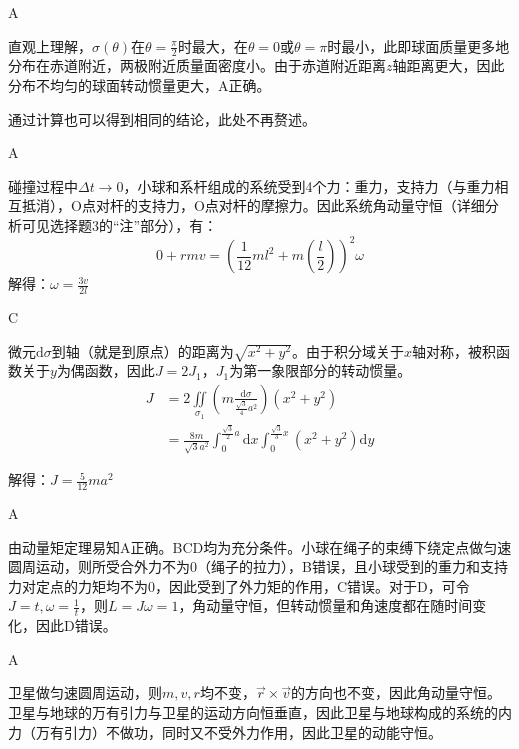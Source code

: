 \documentclass[b5paper,opensource,sourcefont,parskip]{qyxf-book}
\newcommand{\di}[1]{\mathrm{d}#1}
\newcommand{\zbj}[4]
{
	\draw (0,0) node[below left] {$ O $};
	\draw [->] (#1,0) -- (#2,0) node[right] {$ x $};
	\draw [->] (0,#3) -- (0,#4) node[right] {$ y $};
}
\begin{document}
A

直观上理解，$ \sigma(\theta) $在$ \theta=\frac{\pi}{2} $时最大，在$ \theta=0 $或$ \theta=\pi $时最小，此即球面质量更多地分布在赤道附近，两极附近质量面密度小。由于赤道附近距离$ z $轴距离更大，因此分布不均匀的球面转动惯量更大，A正确。\par
通过计算也可以得到相同的结论，此处不再赘述。

A

碰撞过程中$ \Delta t\to 0 $，小球和系杆组成的系统受到4个力：重力，支持力（与重力相互抵消），O点对杆的支持力，O点对杆的摩擦力。因此系统角动量守恒（详细分析可见选择题3的“注”部分），有：
			\[0+rmv=(\frac{1}{12}ml^2+m\left(\frac{l}{2}\right))^2\omega\]
			解得：$\omega=\frac{3v}{2l}$
		
C

\par
微元$ \di{\sigma} $到轴（就是到原点）的距离为$ \sqrt{x^2+y^2} $。由于积分域关于$ x $轴对称，被积函数关于$ y $为偶函数，因此$ J=2J_1 $，$ J_1 $为第一象限部分的转动惯量。
\begin{align*}
J&=2\iint\limits_{\sigma_1}\left(m\frac{\di{\sigma}}{\frac{\sqrt{3}}{4}a^2}\right)(x^2+y^2)\\
&=\frac{8m}{\sqrt{3}a^2}\int_0^{\frac{\sqrt{3}}{2}a}\di{x}\int_0^{\frac{\sqrt{3}}{3}x}(x^2+y^2)\di{y}
\end{align*}\par
解得：$ J=\frac{5}{12}ma^2 $

A

由动量矩定理易知A正确。BCD均为充分条件。小球在绳子的束缚下绕定点做匀速圆周运动，则所受合外力不为0（绳子的拉力），B错误，且小球受到的重力和支持力对定点的力矩均不为0，因此受到了外力矩的作用，C错误。对于D，可令$ J=t,\omega=\frac{1}{t} $，则$ L=J\omega=1 $，角动量守恒，但转动惯量和角速度都在随时间变化，因此D错误。
			
A

卫星做匀速圆周运动，则$ m,v,r $均不变，$ \vec{r}\times\vec{v} $的方向也不变，因此角动量守恒。卫星与地球的万有引力与卫星的运动方向恒垂直，因此卫星与地球构成的系统的内力（万有引力）不做功，同时又不受外力作用，因此卫星的动能守恒。
\end{document}
